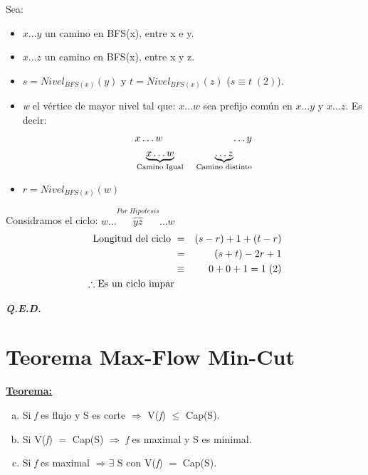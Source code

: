 \documentclass[12pt,a4paper]{report}
\newcommand{\QED}{\hfill \textit{\textbf{Q.E.D.}}}
\begin{document}
\begin{itemize}
\begin{itemize}
  							\vspace{5mm}
  							\par Sea:
  							\begin{itemize}
  								\item $x \dotsc y$ un camino en BFS(x), entre x e y.
  								\item $x \dotsc z$ un camino en BFS(x), entre x y z.
  								\item $s = Nivel_{BFS(x)}(y)$ y $t = Nivel_{BFS(x)}(z)$ ($s \equiv t \; (2)$).
  								\item \textit{w} el vértice de mayor nivel tal que: $x \dotsc w$ sea prefijo común en $x \dotsc y$ y $x \dotsc z$. Es decir:
  									\begin{eqnarray}
  										\nonumber &x \dotsc w & \qquad \dotsc y \\
  										\nonumber &\underbrace{x \dotsc w}_{\textup{Camino Igual}}& \; \underbrace{\dotsc z}_{\textup{Camino distinto}}
  									\end{eqnarray}
  								\item $r = Nivel_{BFS(x)}(w)$
  							\end{itemize}

  						\par Considramos el ciclo: $w \dotsc \overbrace{y z}^{Por \; Hipotesis} \dotsc w$
  						\begin{eqnarray}
  							\nonumber \textup{Longitud del ciclo } &=& (s - r) + 1 + (t - r) \\
  							\nonumber &=& (s + t) - 2r + 1 \\
  							\nonumber &\equiv & 0 + 0 + 1 = 1 \; (2) \\
  							\nonumber \therefore \textup{Es un ciclo impar}
  						\end{eqnarray}
  					\end{itemize}
  			\end{itemize}

  		\QED

  	\section{Teorema Max-Flow Min-Cut}
  		\textbf{\underline{Teorema:}}
  			\begin{enumerate}[a)]
  				\item Si \textit{f} es flujo y S es corte $\Rightarrow$ V(\textit{f}) $\leq$ Cap(S).
  				\item Si V(\textit{f}) $=$ Cap(S) $\Rightarrow$ \textit{f} es maximal y S es minimal.
  				\item Si \textit{f} es maximal $\Rightarrow \exists$ S con V(\textit{f}) $=$ Cap(S).
  			\end{enumerate}
\end{document}
